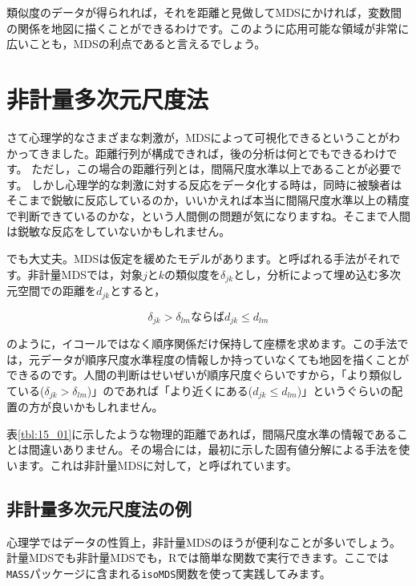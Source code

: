 \documentclass{ltjsbook}
\begin{document}
類似度のデータが得られれば，それを距離と見做してMDSにかければ，変数間の関係を地図に描くことができるわけです。このように応用可能な領域が非常に広いことも，MDSの利点であると言えるでしょう。

\section{非計量多次元尺度法}

さて心理学的なさまざまな刺激が，MDSによって可視化できるということがわかってきました。距離行列が構成できれば，後の分析は何とでもできるわけです。
ただし，この場合の距離行列とは，間隔尺度水準以上であることが必要です。
しかし心理学的な刺激に対する反応をデータ化する時は，同時に被験者はそこまで鋭敏に反応しているのか，いいかえれば本当に間隔尺度水準以上の精度で判断できているのかな，という人間側の問題が気になりますね。そこまで人間は鋭敏な反応をしていないかもしれません。

でも大丈夫。MDSは仮定を緩めたモデルがあります。と呼ばれる手法がそれです。非計量MDSでは，対象$j$と$k$の類似度を$\delta_{jk}$とし，分析によって埋め込む多次元空間での距離を$d_{jk}$とすると，

$$ \delta_{jk} > \delta_{lm} \mbox{ならば}d_{jk}\le d_{lm} $$

のように，イコールではなく順序関係だけ保持して座標を求めます。この手法では，元データが順序尺度水準程度の情報しか持っていなくても地図を描くことができるのです。人間の判断はせいぜいが順序尺度ぐらいですから，「より類似している($\delta_{jk} > \delta_{lm}$)」のであれば「より近くにある($d_{jk}\le d_{lm} $)」というぐらいの配置の方が良いかもしれません。


表\ref{tbl:15_01}に示したような物理的距離であれば，間隔尺度水準の情報であることは間違いありません。その場合には，最初に示した固有値分解による手法を使います。これは非計量MDSに対して，と呼ばれています。

\subsection{非計量多次元尺度法の例}

心理学ではデータの性質上，非計量MDSのほうが便利なことが多いでしょう。計量MDSでも非計量MDSでも，Rでは簡単な関数で実行できます。ここでは\verb|MASS|パッケージに含まれる\verb|isoMDS|関数を使って実践してみます。
\end{document}
